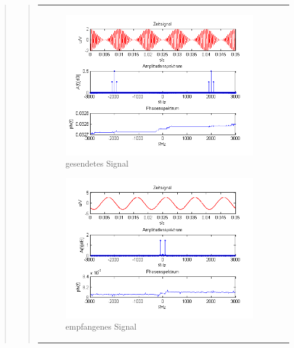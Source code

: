 \begin{quote}
\begin{quote}
\begin{center}
\begin{tabular}{ll}
\begin{minipage}{0.6\textwidth}
                \begin{figure}[H]
                    \label{fig:DemocosinusmT}
                    \includegraphics[scale=0.7]{Bilder/Am_Cos_2k_100Hz_mo}
                    \caption{gesendetes Signal}
                \end{figure}
        
            \end{minipage}
        
            \begin{minipage}{0.6\textwidth}
                \begin{figure}[H]
                    \label{fig:DemocosinusmT2}
                    \includegraphics[scale=0.7]{Bilder/Demo_Sin_2k_100Hz_mo_mitTiefpass}
                    \caption{empfangenes Signal}
                \end{figure}
        

\end{minipage}
\end{tabular}
\end{center}
\end{quote}
\end{quote}
